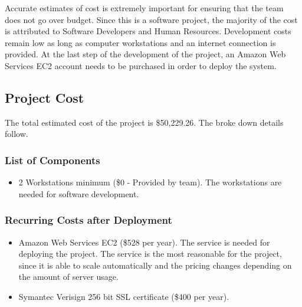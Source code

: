 \label{sec:Budget}

Accurate estimates of cost is extremely important for ensuring that the team
does not go over budget. Since this is a software project, the majority of the
cost is attributed to Software Developers and Human Resources. Development costs
remain low as long as computer workstations and an internet connection is
provided. At the last step of the development of the project, an Amazon Web
Services EC2 account needs to be purchased in order to deploy the system.

\subsection{Project Cost}
The total estimated cost of the project is \$50,229.26. The broke down details
follow.

\subsubsection{List of Components}
\begin{itemize}
\item 2 Workstations minimum (\$0 - Provided by team). The workstations are
needed for software development.
\end{itemize}

\subsubsection{Recurring Costs after Deployment}
\begin{itemize}
\item Amazon Web Services EC2 (\$528 per year). The service is needed for
deploying the project. The service is the most reasonable for the project, since
it is able to scale automatically and the pricing changes depending on the
amount of server usage.
\item Symantec Verisign 256 bit SSL certificate (\$400 per year).
\end{itemize}

